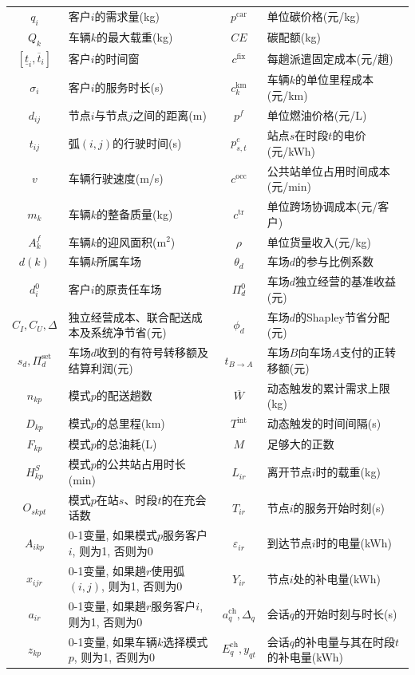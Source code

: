 \documentclass{setp-new}
\begin{document}
\begin{table}[H]
\begin{tabular*}{\linewidth}{@{\extracolsep{\fill}}cJcJ@{}}
$q_i$ & 客户$i$的需求量(kg) & $p^{\mathrm{car}}$ & 单位碳价格(元/kg)\\
$Q_k$ & 车辆$k$的最大载重(kg) & $CE$ & 碳配额(kg)\\
$[\underline t_i,\overline t_i]$ & 客户$i$的时间窗 & $c^{\mathrm{fix}}$ & 每趟派遣固定成本(元/趟)\\
$\sigma_i$ & 客户$i$的服务时长(s) & $c_k^{\mathrm{km}}$ & 车辆$k$的单位里程成本(元/km)\\
$d_{ij}$ & 节点$i$与节点$j$之间的距离(m) & $p^f$ & 单位燃油价格(元/L)\\
$t_{ij}$ & 弧$(i,j)$的行驶时间(s) & $p_{s,t}^{e}$ & 站点$s$在时段$t$的电价(元/kWh)\\
$v$ & 车辆行驶速度(m/s) & $c^{\mathrm{occ}}$ & 公共站单位占用时间成本(元/min)\\
$m_k$ & 车辆$k$的整备质量(kg) & $c^{\mathrm{tr}}$ & 单位跨场协调成本(元/客户)\\
$A_k^f$ & 车辆$k$的迎风面积(m$^2$) & $\rho$ & 单位货量收入(元/kg)\\
$d(k)$ & 车辆$k$所属车场 & $\theta_d$ & 车场$d$的参与比例系数\\
$d_i^0$ & 客户$i$的原责任车场 & $\Pi_d^0$ & 车场$d$独立经营的基准收益(元)\\
$C_I,C_U,\Delta$ & 独立经营成本、联合配送成本及系统净节省(元)
& $\phi_d$ & 车场$d$的Shapley节省分配(元)\\
$s_d,\Pi_d^{\mathrm{set}}$ & 车场$d$收到的有符号转移额及结算利润(元)
& $t_{B\to A}$ & 车场$B$向车场$A$支付的正转移额(元)\\
$n_{kp}$ & 模式$p$的配送趟数 & $\overline W$ & 动态触发的累计需求上限(kg)\\
$D_{kp}$ & 模式$p$的总里程(km) & $T^{\mathrm{int}}$ & 动态触发的时间间隔(s)\\
$F_{kp}$ & 模式$p$的总油耗(L) & $M$ & 足够大的正数\\
$H_{kp}^{S}$ & 模式$p$的公共站占用时长(min) & $L_{ir}$ & 离开节点$i$时的载重(kg)\\
$O_{skpt}$ & 模式$p$在站$s$、时段$t$的在充会话数 & $T_{ir}$ & 节点$i$的服务开始时刻(s)\\
$A_{ikp}$ & 0-1变量, 如果模式$p$服务客户$i$, 则为1, 否则为0 & $\varepsilon_{ir}$ & 到达节点$i$时的电量(kWh)\\
$x_{ijr}$ & 0-1变量, 如果趟$r$使用弧$(i,j)$, 则为1, 否则为0 & $Y_{ir}$ & 节点$i$处的补电量(kWh)\\
$a_{ir}$ & 0-1变量, 如果趟$r$服务客户$i$, 则为1, 否则为0 & $a_q^{\mathrm{ch}},\Delta_q$ & 会话$q$的开始时刻与时长(s)\\
$z_{kp}$ & 0-1变量, 如果车辆$k$选择模式$p$, 则为1, 否则为0 & $E_q^{\mathrm{ch}},y_{qt}$ & 会话$q$的补电量与其在时段$t$的补电量(kWh)\\
\bottomrule
\end{tabular*}
\end{table}
\end{document}
